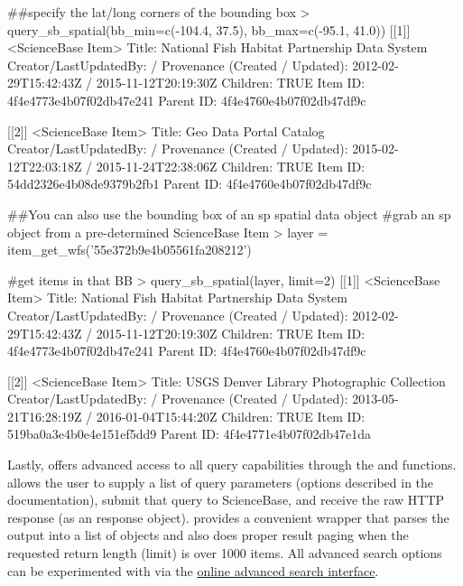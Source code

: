 \begin{example}
##specify the lat/long corners of the bounding box
> query_sb_spatial(bb_min=c(-104.4, 37.5), bb_max=c(-95.1, 41.0))
[[1]]
<ScienceBase Item> 
  Title: National Fish Habitat Partnership Data System
  Creator/LastUpdatedBy:      / 
  Provenance (Created / Updated):  2012-02-29T15:42:43Z / 2015-11-12T20:19:30Z
  Children: TRUE
  Item ID: 4f4e4773e4b07f02db47e241
  Parent ID: 4f4e4760e4b07f02db47df9c

[[2]]
<ScienceBase Item> 
  Title: Geo Data Portal Catalog
  Creator/LastUpdatedBy:      / 
  Provenance (Created / Updated):  2015-02-12T22:03:18Z / 2015-11-24T22:38:06Z
  Children: TRUE
  Item ID: 54dd2326e4b08de9379b2fb1
  Parent ID: 4f4e4760e4b07f02db47df9c

##You can also use the bounding box of an sp spatial data object 
#grab an sp object from a pre-determined ScienceBase Item
> layer = item_get_wfs('55e372b9e4b05561fa208212')

#get items in that BB
> query_sb_spatial(layer, limit=2)
[[1]]
<ScienceBase Item> 
  Title: National Fish Habitat Partnership Data System
  Creator/LastUpdatedBy:      / 
  Provenance (Created / Updated):  2012-02-29T15:42:43Z / 2015-11-12T20:19:30Z
  Children: TRUE
  Item ID: 4f4e4773e4b07f02db47e241
  Parent ID: 4f4e4760e4b07f02db47df9c

[[2]]
<ScienceBase Item> 
  Title: USGS Denver Library Photographic Collection
  Creator/LastUpdatedBy:      / 
  Provenance (Created / Updated):  2013-05-21T16:28:19Z / 2016-01-04T15:44:20Z
  Children: TRUE
  Item ID: 519ba0a3e4b0e4e151ef5dd9
  Parent ID: 4f4e4771e4b07f02db47e1da

\end{example}

Lastly,  offers advanced access to all query capabilities through
the  and  functions.  allows
the user to supply a list of query parameters (options described in the documentation), 
submit that query to ScienceBase, and receive the raw HTTP response (as an  
response object).  provides a convenient wrapper that parses the output
into a list of  objects and also does proper result paging when the requested
return length (limit) is over 1000 items. All advanced search options can be experimented 
with via the  \href{https://www.sciencebase.gov/catalog/items/queryForm}
{online advanced search interface}. 

